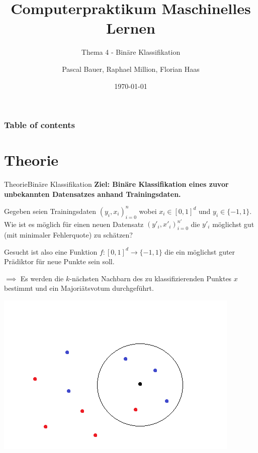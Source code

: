 \documentclass[9pt]{beamer}
\title{Computerpraktikum Maschinelles Lernen}
\subtitle{Thema 4 - Binäre Klassifikation}
\author{Pascal Bauer, Raphael Million, Florian Haas}
\institute{Sommersemester 2020}
\date{\today}
\begin{document}
\titlepage 

\begin{frame}
 \frametitle{Table of contents}
 \tableofcontents
\end{frame}

\section{Theorie}
\begin{frame}{Theorie}{Binäre Klassifikation}
\textbf{Ziel: Binäre Klassifikation eines zuvor unbekannten Datensatzes anhand Trainingsdaten.}

Gegeben seien Trainingsdaten $(y_i,x_i)_{i=0}^n$ wobei $x_i \in [0, 1]^d$ und $y_i \in \{-1, 1\}$.
Wie ist es möglich für einen neuen Datensatz $(y'_i,x'_i)_{i=0}^{n'}$ die $y'_i$ möglichst gut (mit minimaler Fehlerquote) zu schätzen?

Gesucht ist also eine Funktion $f \colon [0,1]^d \to \{-1,1\}$ die ein möglichst guter Prädiktor für neue Punkte sein soll.

$\implies$ Es werden die $k$-nächsten Nachbarn des zu klassifizierenden Punktes $x$ bestimmt und ein Majoriätsvotum durchgeführt.
\begin{center}\includegraphics[scale=0.40]{assets/knearest.png}\end{center}
\end{frame}
\end{document}
